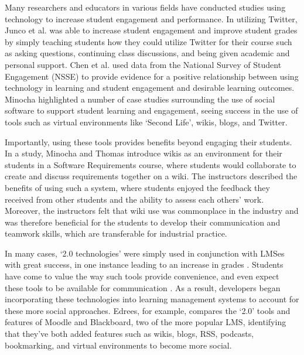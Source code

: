 Many researchers and educators in various fields have conducted studies using technology to increase student engagement and performance. In utilizing Twitter, Junco et al. \cite{junco2011effect} was able to increase student engagement and improve student grades by simply teaching students how they could utilize Twitter for their course such as asking questions, continuing class discussions, and being given academic and personal support. Chen et al. \cite{chen2010engaging} used data from the National Survey of Student Engagement (NSSE) to provide evidence for a positive relationship between using technology in learning and student engagement and desirable learning outcomes. Minocha \cite{minocha2009study} highlighted a number of case studies surrounding the use of social software to support student learning and engagement, seeing success in the use of tools such as virtual environments like `Second Life', wikis, blogs, and Twitter.

Importantly, using these tools provides benefits beyond engaging their students. In a study, Minocha and Thomas \cite{minocha2007collaborative} introduce wikis as an environment for their students in a Software Requirements course, where students would collaborate to create and discuss requirements together on a wiki. The instructors described the benefits of using such a system, where students enjoyed the feedback they received from other students and the ability to assess each others' work. Moreover, the instructors felt that wiki use was commonplace in the industry and was therefore beneficial for the students to develop their communication and teamwork skills, which are transferable for industrial practice.

In many cases, `2.0 technologies' were simply used in conjunction with LMSes with great success, in one instance leading to an increase in grades \cite{conde2014evolving}. Students have come to value the way such tools provide convenience, and even expect these tools to be available for communication \cite{caruso2007ecar}. As a result, developers began incorporating these technologies into learning management systems to account for these more social approaches. Edrees, for example, \cite{edrees2013elearning} compares the `2.0' tools and features of Moodle and Blackboard, two of the more popular LMS, identifying that they’ve both added features such as wikis, blogs, RSS, podcasts, bookmarking, and virtual environments to become more social.

